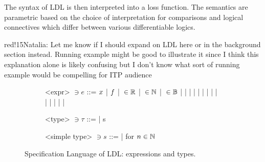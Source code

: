 \documentclass[a4paper,UKenglish,cleveref, autoref, thm-restate]{lipics-v2021}
\newcommand{\natalia}[1]{\begin{authorComment}{red!15}Natalia: #1\end{authorComment}}
\begin{document}
The syntax of LDL is then interpreted into a loss function. The semantics are parametric based on the choice of interpretation for comparisons and logical connectives which differ between various differentiable logics.

\natalia{Let me know if I should expand on LDL here or in the background section instead. Running example might be good to illustrate it since I think this explanation alone is likely confusing but I don't know what sort of running example would be compelling for ITP audience}

\begin{figure}[t]
	\small
	\centering
	\begin{subfigure}[t]{0.45\textwidth}
		\begin{grammar}
			<expr> $\ni e$ ::=  
			$x$ | $f$ | \elReal $\: \in {\mathbb R}$ | \elNat $\: \in \mathbb{N}$ | \elBool $\: \in \mathbb{B}$
			\alt \App{\exprClass}{\exprClass} | \Lam{\identClass}{\typeClass}{\exprClass} | \Let{\identClass}{\typeClass}{\exprClass}{\exprClass}
			\alt \AndSymbol{} | \OrSymbol{} | \NotSymbol{} | \ImpliesSymbol{} | \AddSymbol{} | \NegSymbol{} | \MulSymbol{}
			\alt \NeqSymbol{} | \LeqSymbol{} | \GeqSymbol{} | \LeSymbol{} | \GeSymbol{} | \EqSymbol{}
			\alt \Seq{\exprClass}{\exprClass} | \AtSymbol{}

		\end{grammar}
	\end{subfigure}
	\hfill
	\begin{subfigure}[t]{0.5\textwidth}
		\begin{grammar}
			<type> $\ni \tau$  ::= 
			\FunType{s}{\typeClass} 
			| s
			
			<simple type> $\ni s$ ::= 
			\alt \BoolType
			\alt \RealType
			\alt {}   |    \hspace{3em} for $n \in \mathbb{N}$
		\end{grammar}
	\end{subfigure}
	\setlength{\belowcaptionskip}{-15pt} 
	\caption{Specification Language of LDL: expressions and types. %
	}
	\label{fig:syntax}
\end{figure}

\end{document}
